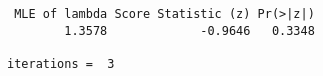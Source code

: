 \begin{verbatim} MLE of lambda Score Statistic (z) Pr(>|z|)
        1.3578             -0.9646   0.3348

iterations =  3 
\end{verbatim}
